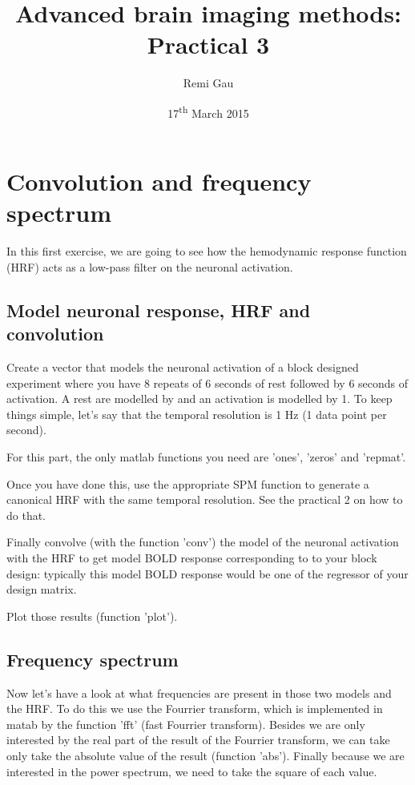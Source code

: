 \documentclass[a4paper,10pt]{article}
\title{Advanced brain imaging methods: Practical 3}
\author{Remi Gau}
\date{17\textsuperscript{th} March 2015}
\begin{document}
\maketitle

\bigskip
\section{Convolution and frequency spectrum}

In this first exercise, we are going to see how the hemodynamic response function (HRF) acts as a low-pass filter on the neuronal activation.


\subsection{Model neuronal response, HRF and convolution}

Create a vector that models the neuronal activation of a block designed experiment where you have 8 repeats of 6 seconds of rest followed by 6 seconds of activation. A rest are modelled by and an activation is modelled by 1. To keep things simple, let's say that the temporal resolution is 1 Hz (1 data point per second).

For this part, the only matlab functions you need are 'ones', 'zeros' and 'repmat'.

Once you have done this, use the appropriate SPM function to generate a canonical HRF with the same temporal resolution. See the practical 2 on how to do that.

Finally convolve (with the function 'conv') the model of the neuronal activation with the HRF to get model BOLD response corresponding to to your block design: typically this model BOLD response would be one of the regressor of your design matrix.

Plot those results (function 'plot').


\subsection{Frequency spectrum}

Now let's have a look at what frequencies are present in those two models and the HRF. To do this we use the Fourrier transform, which is implemented in matab by the function 'fft' (fast Fourrier transform). Besides we are only interested by the real part of the result of the Fourrier transform, we can take only take the absolute value of the result (function 'abs'). Finally because we are interested in the power spectrum, we need to take the square of each value.
\end{document}
